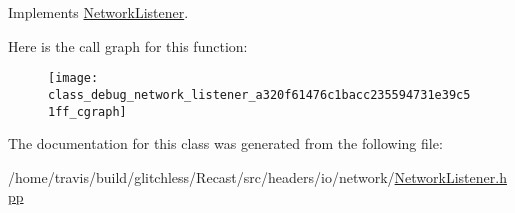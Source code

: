 Implements \hyperlink{class_network_listener_a721846b67227e7b3ac96c3d7d7065655}{Network\-Listener}.



Here is the call graph for this function\-:
\nopagebreak
\begin{figure}[H]
\begin{center}
\leavevmode
\texttt{[image: class\_debug\_network\_listener\_a320f61476c1bacc235594731e39c51ff\_cgraph]}
\end{center}
\end{figure}




The documentation for this class was generated from the following file\-:\begin{DoxyCompactItemize}
\item 
/home/travis/build/glitchless/\-Recast/src/headers/io/network/\hyperlink{_network_listener_8hpp}{Network\-Listener.\-hpp}\end{DoxyCompactItemize}
